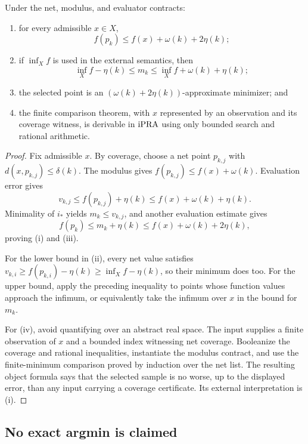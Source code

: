 \begin{theorem}
\label{thm:finite-net-min}
Under the net, modulus, and evaluator contracts:
\begin{enumerate}[label=(\roman*),leftmargin=2.4em]
\item for every admissible \(x\in X\),
\[
   f(p_k)\le f(x)+\omega(k)+2\eta(k);
\]
\item if \(\inf_X f\) is used in the external semantics, then
\[
   \inf_X f-\eta(k)\le m_k
   \le \inf_X f+\omega(k)+\eta(k);
\]
\item the selected point is an
\((\omega(k)+2\eta(k))\)-approximate minimizer; and
\item the finite comparison theorem, with \(x\) represented by an observation and its
coverage witness, is derivable in \(\mathrm{iPRA}\) using only bounded search and rational
arithmetic.
\end{enumerate}
\end{theorem}

\begin{proof}
Fix admissible \(x\).  By coverage, choose a net point \(p_{k,j}\) with
\(d(x,p_{k,j})\le\delta(k)\).  The modulus gives
\(f(p_{k,j})\le f(x)+\omega(k)\).  Evaluation error gives
\[
   v_{k,j}\le f(p_{k,j})+\eta(k)
            \le f(x)+\omega(k)+\eta(k).
\]
Minimality of \(i_*\) yields \(m_k\le v_{k,j}\), and another evaluation estimate gives
\[
   f(p_k)\le m_k+\eta(k)
           \le f(x)+\omega(k)+2\eta(k),
\]
proving (i) and (iii).

For the lower bound in (ii), every net value satisfies
\(v_{k,i}\ge f(p_{k,i})-\eta(k)\ge\inf_X f-\eta(k)\), so their minimum does too.  For
the upper bound, apply the preceding inequality to points whose function values
approach the infimum, or equivalently take the infimum over \(x\) in the bound for
\(m_k\).

For (iv), avoid quantifying over an abstract real space.  The input supplies a finite
observation of \(x\) and a bounded index witnessing net coverage.  Booleanize the
coverage and rational inequalities, instantiate the modulus contract, and use the
finite-minimum comparison proved by induction over the net list.  The resulting object
formula says that the selected sample is no worse, up to the displayed error, than any
input carrying a coverage certificate.  Its external interpretation is (i).
\end{proof}

\subsection{No exact argmin is claimed}

